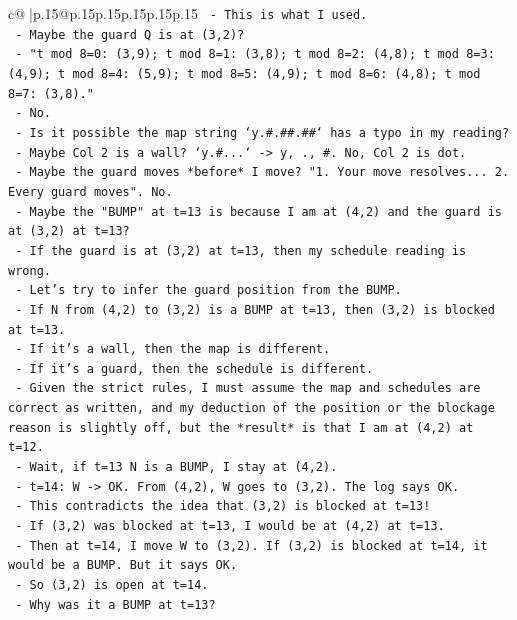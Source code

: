 \documentclass{article}
\begin{document}
{\begin{supertabular}{c@{$\;$}|p{.15\linewidth}@{}p{.15\linewidth}p{.15\linewidth}p{.15\linewidth}p{.15\linewidth}p{.15\linewidth}}
{{{\texttt{    {-} This is what I used.} \\
\texttt{    {-} Maybe the guard Q is at (3,2)?} \\
\texttt{    {-} "t mod 8=0: (3,9); t mod 8=1: (3,8); t mod 8=2: (4,8); t mod 8=3: (4,9); t mod 8=4: (5,9); t mod 8=5: (4,9); t mod 8=6: (4,8); t mod 8=7: (3,8)."} \\
\texttt{    {-} No.} \\
\texttt{    {-} Is it possible the map string `y.\#.\#\#.\#\#` has a typo in my reading?} \\
\texttt{    {-} Maybe Col 2 is a wall? `y.\#...` {-}> y, ., \#. No, Col 2 is dot.} \\
\texttt{    {-} Maybe the guard moves *before* I move? "1. Your move resolves... 2. Every guard moves". No.} \\
\texttt{    {-} Maybe the "BUMP" at t=13 is because I am at (4,2) and the guard is at (3,2) at t=13?} \\
\texttt{    {-} If the guard is at (3,2) at t=13, then my schedule reading is wrong.} \\
\texttt{    {-} Let's try to infer the guard position from the BUMP.} \\
\texttt{    {-} If N from (4,2) to (3,2) is a BUMP at t=13, then (3,2) is blocked at t=13.} \\
\texttt{    {-} If it's a wall, then the map is different.} \\
\texttt{    {-} If it's a guard, then the schedule is different.} \\
\texttt{    {-} Given the strict rules, I must assume the map and schedules are correct as written, and my deduction of the position or the blockage reason is slightly off, but the *result* is that I am at (4,2) at t=12.} \\
\texttt{    {-} Wait, if t=13 N is a BUMP, I stay at (4,2).} \\
\texttt{    {-} t=14: W {-}> OK. From (4,2), W goes to (3,2). The log says OK.} \\
\texttt{    {-} This contradicts the idea that (3,2) is blocked at t=13!} \\
\texttt{    {-} If (3,2) was blocked at t=13, I would be at (4,2) at t=13.} \\
\texttt{    {-} Then at t=14, I move W to (3,2). If (3,2) is blocked at t=14, it would be a BUMP. But it says OK.} \\
\texttt{    {-} So (3,2) is open at t=14.} \\
\texttt{    {-} Why was it a BUMP at t=13?} \\
}}}
\end{supertabular}}
\end{document}

